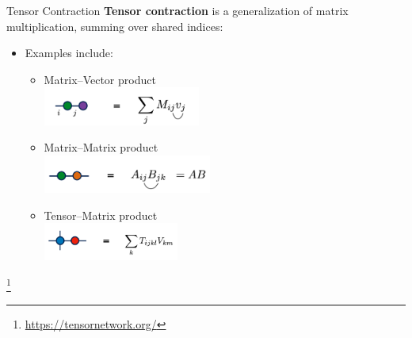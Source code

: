 \documentclass{beamer}
\newcommand\blfootnote[1]{%
  \begingroup
  \renewcommand\thefootnote{}\footnote{#1}%
  \addtocounter{footnote}{-1}%
  \endgroup
}
\begin{document}
\begin{frame}{Tensor Contraction}
    \textbf{Tensor contraction} is a generalization of matrix multiplication, summing over shared indices:

    \begin{itemize}
        \item Examples include:
        \begin{itemize}
            \item Matrix–Vector product\\
                \includegraphics[height=1.25cm]{images/TensorNetwork Images/MatVecContraction.png}
            \item Matrix–Matrix product\\
                \includegraphics[height=1.25cm]{images/TensorNetwork Images/MatMatContraction.png}
            \item Tensor–Matrix product\\
                \includegraphics[height=1.25cm]{images/TensorNetwork Images/TensorMatContraction.png}
        \end{itemize}
    \end{itemize}

    \vspace{0.5em}
    \blfootnote{\url{https://tensornetwork.org/}}
\end{frame}
\end{document}
